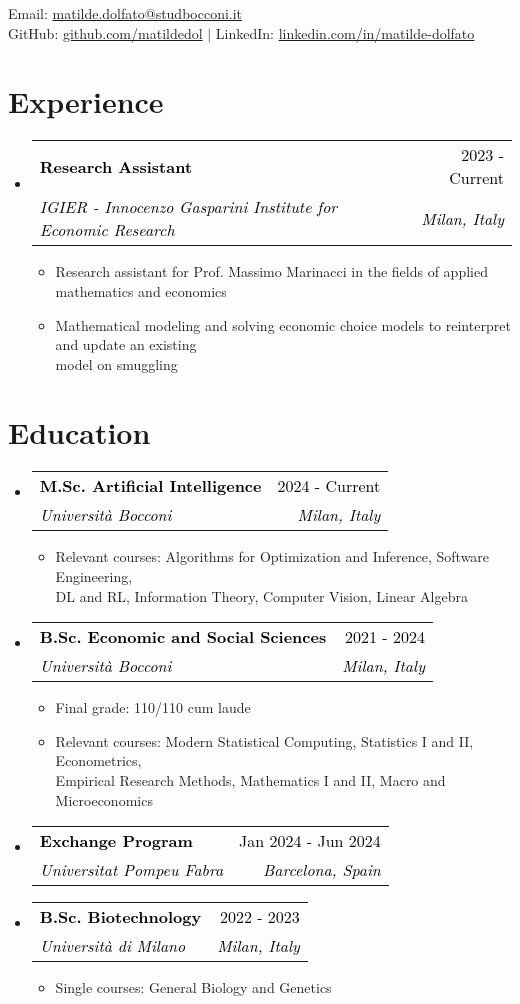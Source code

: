 \documentclass[letterpaper,11pt]{article}
\makeatletter
\newcommand{\resumeSubheading}[4]{
  \vspace{-2pt}\item
    \begin{tabular*}{1.0\textwidth}[t]{l@{\extracolsep{\fill}}r}
      \textbf{\small \textcolor{black}{#1}} & \footnotesize  \textcolor{black}{#2} \\
      \small  \textit{\textcolor{black}{#3}} & \small  \textcolor{black}{#4} \\
    \end{tabular*}\vspace{-3pt}
}
\newcommand{\resumeSubHeadingListStart}{\begin{itemize}[leftmargin=0in, label={}]}
\newcommand{\resumeSubHeadingListEnd}{\end{itemize}}
\newcommand{\resumeItemListStart}{\begin{itemize}[label=--]}
\newcommand{\resumeItemListEnd}{\end{itemize}\vspace{-5pt}}
\newcommand{\resumeItem}[1]{
  \item\small{
    {#1 \vspace{-2pt}}
  }
}
\makeatother
\begin{document}
\vspace*{-1cm}  %
\noindent
\footnotesize Email: \href{mailto:matilde.dolfato@studbocconi.it}{matilde.dolfato@studbocconi.it} \\
\footnotesize GitHub: \href{https://github.com/matildedol}{github.com/matildedol} $|$ LinkedIn: \href{https://linkedin.com/in/matilde-dolfato-556304177}{linkedin.com/in/matilde-dolfato}
\vspace{0cm}

\section{Experience}
\resumeSubHeadingListStart
\resumeSubheading
{Research Assistant}{2023 - Current}
{IGIER - Innocenzo Gasparini Institute for Economic Research}{\textit{Milan, Italy}}
\resumeItemListStart
    \resumeItem{Research assistant for Prof. Massimo Marinacci in the fields of applied mathematics and economics}
    \resumeItem{Mathematical modeling and solving economic choice models to reinterpret and update an existing\\ model on smuggling}
\resumeItemListEnd
\resumeSubHeadingListEnd
\vspace*{-.3cm}

\section{Education}
\resumeSubHeadingListStart
\vspace*{0.1cm}
\resumeSubheading
{M.Sc. Artificial Intelligence}{2024 - Current}
{Università Bocconi}{\textit{Milan, Italy}}
\resumeItemListStart
    \resumeItem{Relevant courses: Algorithms for Optimization and Inference, Software Engineering,\\ DL and RL, Information Theory, Computer Vision, Linear Algebra}
\resumeItemListEnd
\vspace*{0.2cm}

\resumeSubheading
{B.Sc. Economic and Social Sciences}{2021 - 2024}
{Università Bocconi}{\textit{Milan, Italy}}
\resumeItemListStart
    \resumeItem{Final grade: 110/110 cum laude}
    \resumeItem{Relevant courses: Modern Statistical Computing, Statistics I and II, Econometrics, \\Empirical Research Methods, Mathematics I and II, Macro and Microeconomics}
\resumeItemListEnd
\vspace*{0.2cm}
\resumeSubheading
{Exchange Program}{Jan 2024 - Jun 2024}
{Universitat Pompeu Fabra}{\textit{Barcelona, Spain}}
\vspace*{0.1cm}
\resumeSubheading
{B.Sc. Biotechnology}{2022 - 2023}
{Università di Milano}{\textit{Milan, Italy}}
\resumeItemListStart
\resumeItem\small{Single courses: General Biology and Genetics}
\resumeItemListEnd
\resumeSubHeadingListEnd
\vspace*{-0.3cm}
\end{document}
